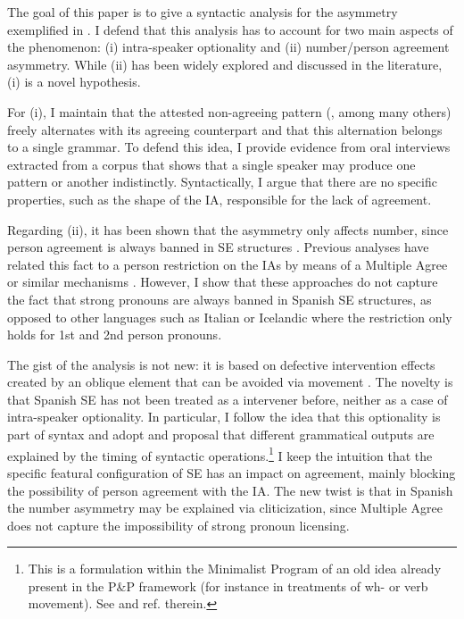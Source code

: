 \documentclass[output=paper,colorlinks,citecolor=brown]{langscibook}
\begin{document}
The goal of this paper is to give a syntactic analysis for the asymmetry exemplified in . I defend that this analysis has to account for two main aspects of the phenomenon: (i) intra-speaker optionality and (ii) number/person agreement asymmetry. While (ii) has been widely explored and discussed in the literature, (i) is a novel hypothesis.

For (i), I maintain that the attested non-agreeing pattern (\citealt{RaposoUriag1996,DAlessandro2007,Mendikoetxea1999,OrmazabalRomero2019,SanchezLopez2002}, among many others) freely alternates with its agreeing counterpart and that this alternation belongs to a single grammar. To defend this idea, I provide evidence from oral interviews extracted from a corpus that shows that a single speaker may produce one pattern or another indistinctly. Syntactically, I argue that there are no specific properties, such as the shape of the IA, responsible for the lack of agreement.

Regarding (ii), it has been shown that the asymmetry only affects number, since person agreement is always banned in SE structures \citep{Lopez2007}. Previous analyses have related this fact to a person restriction on the IAs by means of a Multiple Agree or similar mechanisms \citep{DAlessandro2007,Lopez2007}. However, I show that these approaches do not capture the fact that strong pronouns are always banned in Spanish SE structures, as opposed to other languages such as Italian or Icelandic where the restriction only holds for 1st and 2nd person pronouns.

The gist of the analysis is not new: it is based on defective intervention effects \citep{Chomsky2001a} created by an oblique element that can be avoided via movement \citep{Sigurdsson1992,Sirg_Holm2008}. The novelty is that Spanish SE has not been treated as a intervener before, neither as a case of intra-speaker optionality. In particular, I follow the idea that this optionality is part of syntax \citep{Biberauer_Richards2006} and adopt  and  proposal that different grammatical outputs are explained by the timing of syntactic operations.\footnote{This is a formulation within the Minimalist Program of an old idea already present in the P\&P framework (for instance in treatments of wh- or verb movement). See \citet{Georgi2014} and ref. therein.}
I keep the intuition that the specific featural configuration of SE has an impact on agreement, mainly blocking the possibility of person agreement with the IA. The new twist is that in Spanish the number asymmetry may be explained via cliticization, since Multiple Agree does not capture the impossibility of strong pronoun licensing.
\end{document}
